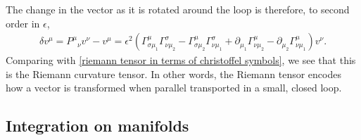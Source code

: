 The change in the vector as it is rotated around the loop is therefore, to second order in $\epsilon$,
%
\begin{align}
    \delta v^\mu 
    = P^\mu{}_\nu v^\nu - v^\mu 
    = \epsilon^2  
    \left(
        \Gamma^\mu_{\sigma \mu_1} \Gamma^\sigma_{\nu \mu_2}
        -\Gamma^\mu_{\sigma \mu_2} \Gamma^\sigma_{\nu \mu_1}
        + \partial_{\mu_1} \Gamma^{\mu}_{\nu \mu_2}
        - \partial_{\mu_2} \Gamma^{\mu}_{\nu \mu_1} 
    \right) v^\nu.
\end{align}
Comparing with \autoref{riemann tensor in terms of christoffel symbols}, we see that this is the Riemann curvature tensor.
In other words, the Riemann tensor encodes how a vector is transformed when parallel transported in a small, closed loop.



\subsection{Integration on manifolds}
\label{subsection: integration on manifolds}

